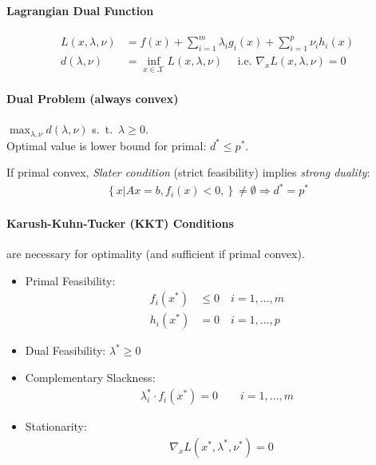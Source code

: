 \documentclass[landscape,a4paper,8pt]{scrartcl}
\newcommand{\mc}[1]{\mathcal{#1}}
\begin{document}
\begin{multicols*}{3}
\paragraph{Lagrangian Dual Function}
\begin{align*}
	L(x,\lambda,\nu) & = f(x) + \sum_{i=1}^{m}\lambda_i g_i(x) + \sum_{i=1}^{p}\nu_i h_i(x) \\
	d(\lambda,\nu) & = \inf_{x \in \mc{X}} L(x,\lambda,\nu) \quad \text{ i.e. } \nabla_x L(x, \lambda, \nu) = 0
\end{align*}
\paragraph{Dual Problem (always convex)} 
$\max_{\lambda,\nu} d(\lambda,\nu)$ s.\ t.\ $\lambda \geq 0$. \\
Optimal value is lower bound for primal: $d^* \leq p^*$.

If primal convex, \emph{Slater condition} (strict feasibility) implies \emph{strong duality}:
\begin{align*}
	\left\{x \left| \right. Ax=b, f_i(x)<0, \right\} \neq \emptyset \Rightarrow d^*  = p^*
\end{align*}

\paragraph{Karush-Kuhn-Tucker (KKT) Conditions}
are necessary for optimality (and sufficient if primal convex).
\begin{itemize}
	\item Primal Feasibility:
		\begin{align*}
			f_i(x^*) &\leq 0 \quad i=1,\dots,m\\
			h_i(x^*) &=0 \quad i=1,\dots,p
		\end{align*}
	\item Dual Feasibility:  $\lambda^* \geq 0$
	\item Complementary Slackness:
		\begin{align*}
			\lambda_i^* \cdot f_i(x^*) = 0 \quad \quad i=1,\dots,m
		\end{align*}
	\item Stationarity:
		\begin{align*}
			&\nabla_x L(x^*,\lambda^*,\nu^*) =0 \\
		\end{align*}
\end{itemize}


\end{multicols*}
\end{document}
